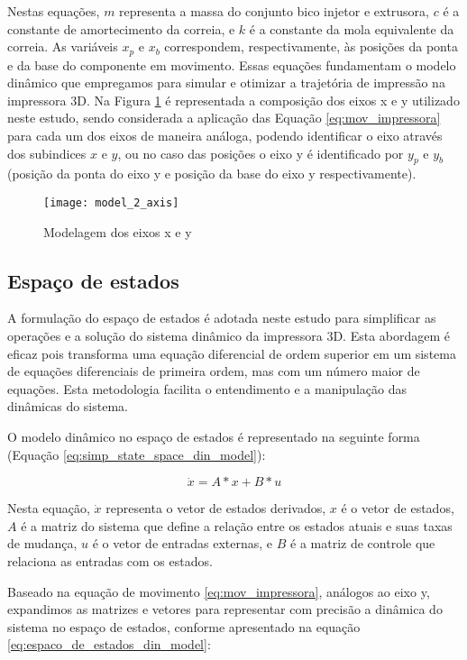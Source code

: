 Nestas equações, \(m\) representa a massa do conjunto bico injetor e extrusora, \(c\) é a constante de amortecimento da correia, e \(k\) é a constante da mola equivalente da correia. As variáveis \(x_p\) e \(x_b\) correspondem, respectivamente, às posições da ponta e da base do componente em movimento. Essas equações fundamentam o modelo dinâmico que empregamos para simular e otimizar a trajetória de impressão na impressora 3D. Na Figura \ref{fig:model_2_axis} é representada a composição dos eixos x e y utilizado neste estudo, sendo considerada a aplicação das Equação \ref{eq:mov_impressora} para cada um dos eixos de maneira análoga, podendo identificar o eixo através dos subindices \(x\) e \(y\), ou no caso das posições o eixo y é identificado por \(y_p\) e \(y_b\) (posição da ponta do eixo y e posição da base do eixo y respectivamente).

\begin{figure}[H]
    \centering
    \caption{Modelagem dos eixos x e y}
    \texttt{[image: model\_2\_axis]}

    \label{fig:model_2_axis}
\end{figure}

\subsection{Espaço de estados}
A formulação do espaço de estados é adotada neste estudo para simplificar as operações e a solução do sistema dinâmico da impressora 3D. Esta abordagem é eficaz pois transforma uma equação diferencial de ordem superior em um sistema de equações diferenciais de primeira ordem, mas com um número maior de equações. Esta metodologia facilita o entendimento e a manipulação das dinâmicas do sistema.

O modelo dinâmico no espaço de estados é representado na seguinte forma (Equação \ref{eq:simp_state_space_din_model}):

\begin{equation}
    \label{eq:simp_state_space_din_model}
    \dot x = A*x+B*u
\end{equation}

Nesta equação, \(\dot x\) representa o vetor de estados derivados, \(x\) é o vetor de estados, \(A\) é a matriz do sistema que define a relação entre os estados atuais e suas taxas de mudança, \(u\) é o vetor de entradas externas, e \(B\) é a matriz de controle que relaciona as entradas com os estados.

Baseado na equação de movimento \ref{eq:mov_impressora}, análogos ao eixo y, expandimos as matrizes e vetores para representar com precisão a dinâmica do sistema no espaço de estados, conforme apresentado na equação \ref{eq:espaco_de_estados_din_model}:

